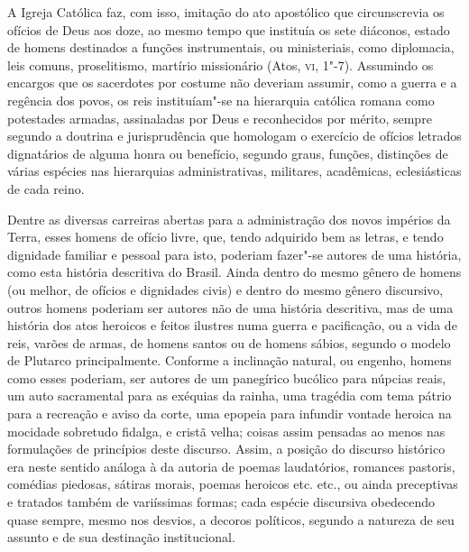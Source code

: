 A Igreja Católica faz, com isso, imitação do ato apostólico que
circunscrevia os ofícios de Deus aos doze, ao mesmo tempo que instituía
os sete diáconos, estado de homens destinados a funções instrumentais,
ou ministeriais, como diplomacia, leis comuns, proselitismo, martírio
missionário (Atos, \textsc{vi}, 1"-7). Assumindo os encargos que os sacerdotes
por costume não deveriam assumir, como a guerra e a regência dos povos,
os reis instituíam"-se na hierarquia católica romana como potestades
armadas, assinaladas por Deus e reconhecidos por mérito, sempre segundo
a doutrina e jurisprudência que homologam o exercício de ofícios
letrados dignatários de alguma honra ou benefício, segundo graus,
funções, distinções de várias espécies nas hierarquias administrativas,
militares, acadêmicas, eclesiásticas de cada reino. 

Dentre as diversas carreiras abertas para a administra\-ção dos novos
impérios da Terra, esses homens de ofício livre, que, tendo adquirido
bem as letras, e tendo dignidade familiar e pessoal para isto, poderiam
fazer"-se autores de uma história,
como esta história descritiva do Brasil. Ainda dentro do mesmo gênero
de homens (ou melhor, de ofícios e dignidades civis) e dentro do mesmo
gênero discursivo, outros homens poderiam ser autores não de uma
história descritiva, mas de uma história dos atos heroicos e feitos
ilustres numa guerra e pacificação, ou a vida de reis, varões de armas,
de homens santos ou de homens sábios, segundo o modelo de Plutarco
principalmente. Conforme a inclinação natural, ou engenho, homens como
esses poderiam, ser autores de um panegírico bucólico para núpcias
reais, um auto sacramental para as exéquias da rainha, uma tragédia com
tema pátrio para a recreação e aviso da corte, uma epopeia para
infundir vontade heroica na mocidade sobretudo fidalga, e cristã velha;
coisas assim pensadas ao menos nas formulações de princípios deste
discurso. Assim, a posição do discurso histórico era neste sentido
análoga à da autoria de poemas laudatórios, romances pastoris, comédias
piedosas, sátiras morais, poemas heroicos etc. etc., ou ainda
preceptivas e tratados também de variíssimas formas; cada espécie
discursiva obedecendo quase sempre, mesmo nos desvios, a decoros
políticos, segundo a natureza de seu assunto e de sua destinação institucional.


